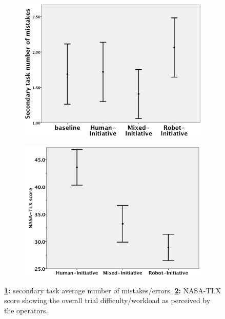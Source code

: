 \documentclass[a4paper,12pt,oneside,openright]{bhamthesis}
\begin{document}
	\begin{figure}
		\centering
		\begin{subfigure}[b]{0.48\textwidth}
			\centering
			\includegraphics[width=\textwidth]{chapter5_fig/exp2_2_secondary_mistakes.png}
			\caption{}
			\label{subfig:psecondary_mistakes_exp2_2}
		\end{subfigure}
		\hfill
		\begin{subfigure}[b]{0.48\textwidth}
			\centering
			\includegraphics[width=\textwidth]{chapter5_fig/exp2_2_NASA-TLX.png}
			\caption{}
			\label{subfig:NASA-TLX_exp2_2}
		\end{subfigure}
		\hfill
		\caption{ \textbf{\ref{subfig:psecondary_mistakes_exp2_2}:} secondary task average number of mistakes/errors. \textbf{\ref{subfig:NASA-TLX_exp2_2}:} NASA-TLX score showing the overall trial difficulty/workload as perceived by the operators.}
		\label{fig:nasa_secondary_exp2_2}
	\end{figure}
    
\end{document}
